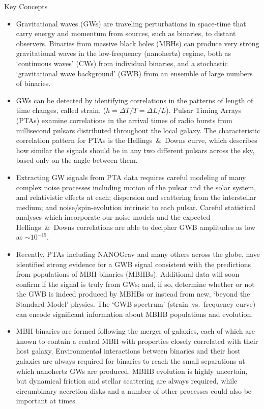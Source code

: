 \documentclass[onecolumn,authoryear]{els-mrw}
\begin{document}
\begin{BoxTypeA}{Key Concepts}
\begin{itemize}
    \item Gravitational waves (GWs) are traveling perturbations in space-time that carry energy and momentum from sources, such as binaries, to distant observers.  Binaries from massive black holes (MBHs) can produce very strong gravitational waves in the low-frequency (nanohertz) regime, both as `continuous waves' (CWs) from individual binaries, and a stochastic `gravitational wave background' (GWB) from an ensemble of large numbers of binaries.
    \item GWs can be detected by identifying correlations in the patterns of length of time changes, called strain, ($h = \Delta T / T = \Delta L / L$).  Pulsar Timing Arrays (PTAs) examine correlations in the arrival times of radio bursts from millisecond pulsars distributed throughout the local galaxy.  The characteristic correlation pattern for PTAs is the Hellings~\&~Downs curve, which describes how similar the signals should be in any two different pulsars across the sky, based only on the angle between them.
    \item Extracting GW signals from PTA data requires careful modeling of many complex noise processes including motion of the pulsar and the solar system, and relativistic effects at each; dispersion and scattering from the interstellar medium; and noise/spin-evolution intrinsic to each pulsar.  Careful statistical analyses which incorporate our noise models and the expected Hellings~\&~Downs correlations are able to decipher GWB amplitudes as low as $\sim 10^{-15}$.
    \item Recently, PTAs including NANOGrav and many others across the globe, have identified strong evidence for a GWB signal consistent with the predictions from populations of MBH binaries (MBHBs).  Additional data will soon confirm if the signal is truly from GWs; and, if so, determine whether or not the GWB is indeed produced by MBHBs or instead from new, `beyond the Standard Model' physics.  The `GWB spectrum' (strain~vs.~frequency curve) can encode significant information about MBHB populations and evolution.
    \item MBH binaries are formed following the merger of galaxies, each of which are known to contain a central MBH with properties closely correlated with their host galaxy.  Environmental interactions between binaries and their host galaxies are always required for binaries to reach the small separations at which nanohertz GWs are produced.  MBHB evolution is highly uncertain, but dynamical friction and stellar scattering are always required, while circumbinary accretion disks and a number of other processes could also be important at times.

\end{itemize}
\end{BoxTypeA}
\end{document}

